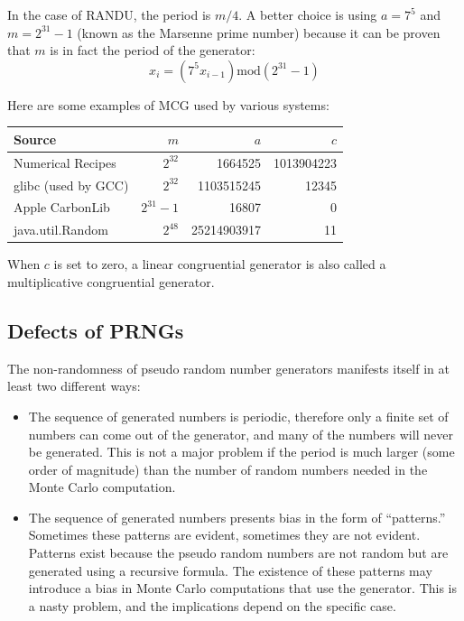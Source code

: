 \documentclass[justified, sixbynine]{tufte-book}
\theoremstyle{plain}%
\newtheorem * {corollary}{Corollary}
\theoremstyle{definition}
\theoremstyle{remark}
\newtheorem * {remark}{Remark}
\newtheorem * {note}{Note}
\begin{document}
\begin{fullwidth}
In the case of RANDU, the period is $m/4$. A better choice is using $a=7^5$ and $m=2^{31}-1$ (known as the Marsenne prime number) because it can be proven that $m$ is in fact the period of the generator:
\begin{equation}
x_i=(7^5x_{i-1})\textrm{mod}(2^{31}-1)  \label{Marsenne}
\end{equation}

Here are some examples of MCG used by various systems:

\begin{tabular}{|lrrr|} \hline
Source & $m$ & $a$ & $c$ \\ \hline
Numerical Recipes & $2^{32}$ & 1664525 & 1013904223 \\
glibc (used by GCC) & $2^{32}$ & 1103515245 & 12345 \\
Apple CarbonLib & $2^{31} - 1$ & 16807 & 0 \\
java.util.Random & $2^{48}$ & 25214903917 & 11 \\ \hline
\end{tabular}

When $c$ is set to zero, a linear congruential generator is also called a multiplicative congruential generator.

\goodbreak\subsection{Defects of PRNGs}

The non-randomness of pseudo random number generators manifests itself in at
least two different ways:

\begin{itemize}
\item  The sequence of generated numbers is periodic, therefore only a finite
set of numbers can come out of the generator, and many of the numbers will never be
generated. This is not a major problem if the period is much larger (some
order of magnitude) than the number of random numbers needed in the Monte
Carlo computation.

\item  The sequence of generated numbers presents bias in the form of
``patterns.'' Sometimes
these patterns are evident, sometimes they are not evident. Patterns exist
because the pseudo random numbers are not random but are generated using a
recursive formula. The existence of these patterns may introduce a bias in
Monte Carlo computations that use the generator. This is a nasty problem, and
the implications depend on the specific case.
\end{itemize}


\end{fullwidth}
\end{document}
